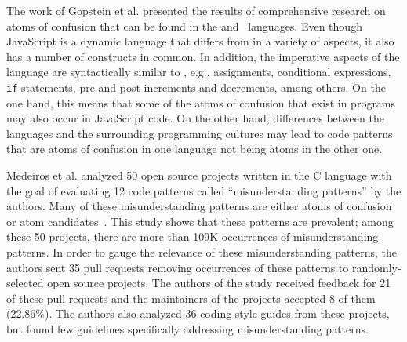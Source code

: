 The work of Gopstein et al. \cite{DBLP:conf/sigsoft/GopsteinIYDZYC17} presented the results of comprehensive research on atoms of confusion that can be found in the \clang and \cpplang~languages. Even though JavaScript is a dynamic language that differs from \clang in a variety of aspects, it also has a number of constructs in common. In addition, the imperative aspects of the language are syntactically similar to \clang, e.g., assignments, conditional expressions, \texttt{if}-statements, pre and post increments and decrements, among others. On the one hand, this means that some of the atoms of confusion that exist in \clang programs may also occur in JavaScript code. On the other hand, differences between the languages and the surrounding programming cultures may lead to code patterns that are atoms of confusion in one language not being atoms in the other one.  

Medeiros et al. \cite{DBLP:journals/ese/MedeirosLAAKRG19} analyzed 50 open source projects written in the C language with the goal of evaluating 12 code patterns called ``misunderstanding patterns'' by the authors. Many of these misunderstanding patterns are either atoms of confusion or atom candidates~\cite{DBLP:conf/sigsoft/GopsteinIYDZYC17}. This study shows that these patterns are prevalent; among these 50 projects, there are more than 109K occurrences of misunderstanding patterns. 
In order to gauge the relevance of these misunderstanding patterns, the authors sent 35 pull requests removing occurrences of these patterns to randomly-selected open source projects. The authors of the study received feedback for 21 of these pull requests and the maintainers of the projects accepted 8 of them (22.86\%). The authors also analyzed 36 coding style guides from these projects, but found few guidelines specifically addressing misunderstanding patterns. 


